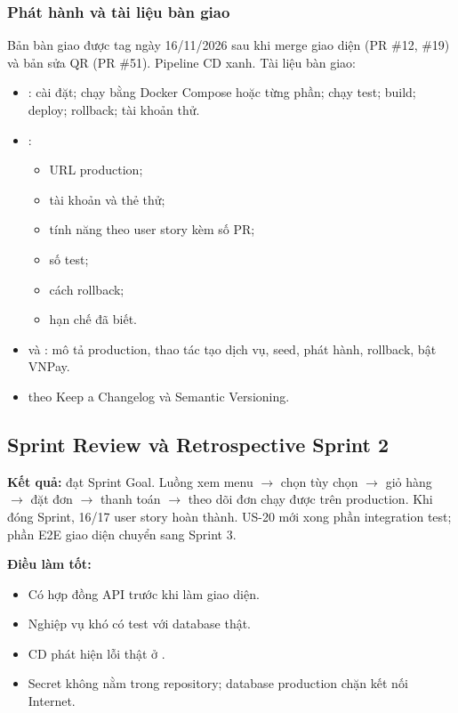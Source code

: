 \subsubsection{Phát hành và tài liệu bàn giao}
Bản bàn giao  được tag ngày 16/11/2026 sau khi merge giao diện (PR \#12, \#19) và bản sửa QR (PR \#51). Pipeline CD xanh. Tài liệu bàn giao:
\begin{itemize}
\item {}: cài đặt; chạy bằng Docker Compose hoặc từng phần; chạy test; build; deploy; rollback; tài khoản thử.
\item {}:
  \begin{itemize}
  \item URL production;
  \item tài khoản và thẻ thử;
  \item tính năng theo user story kèm số PR;
  \item số test;
  \item cách rollback;
  \item hạn chế đã biết.
  \end{itemize}
\item {} và : mô tả production, thao tác tạo dịch vụ, seed, phát hành, rollback, bật VNPay.
\item {} theo Keep a Changelog và Semantic Versioning.
\end{itemize}

\subsection{Sprint Review và Retrospective Sprint 2}
\textbf{Kết quả:} đạt Sprint Goal. Luồng xem menu $\rightarrow$ chọn tùy chọn $\rightarrow$ giỏ hàng $\rightarrow$ đặt đơn $\rightarrow$ thanh toán $\rightarrow$ theo dõi đơn chạy được trên production. Khi đóng Sprint, 16/17 user story hoàn thành. US-20 mới xong phần integration test; phần E2E giao diện chuyển sang Sprint 3.

\textbf{Điều làm tốt:}
\begin{itemize}
\item Có hợp đồng API trước khi làm giao diện.
\item Nghiệp vụ khó có test với database thật.
\item CD phát hiện lỗi thật ở .
\item Secret không nằm trong repository; database production chặn kết nối Internet.
\end{itemize}

